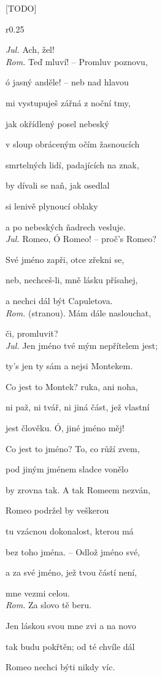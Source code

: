 \documentclass{extarticle} %
\begin{document}
\newpage


\changefontsize{8pt}

[TODO]

\noindent\begin{wrapfigure}{r}{0.25\textwidth}
\tiny

\setlength{\parindent}{3pt}
\noindent \textit{Jul.} Ach, žel! \\
\textit{Rom.} Teď mluví! -- Promluv poznovu, \par
ó jasný anděle! -- neb nad hlavou \par
mi vystupuješ zářná z noční tmy, \par
jak okřídlený posel nebeský \par
v sloup obráceným očím žasnoucích \par
smrtelných lidí, padajících na znak, \par
by dívali se naň, jak osedlal \par
si lenivě plynoucí oblaky \par
a po nebeských ňadrech vesluje. \\
\textit{Jul.} Romeo, Ó Romeo! -- proč's Romeo? \par
Své jméno zapři, otce zřekni se, \par
neb, nechceš-li, mně lásku přísahej, \par
a nechci dál být Capuletova. \\
\textit{Rom.} (stranou). Mám dále naslouchat, \par 
či, promluvit? \\
\textit{Jul.} Jen jméno tvé mým nepřítelem jest; \par
ty's jen ty sám a nejsi Montekem. \par
Co jest to Montek? ruka, ani noha, \par
ni paž, ni tvář, ni jiná část, jež vlastní \par
jest člověku. Ó, jiné jméno měj! \par
Co jest to jméno? To, co růží zvem, \par
pod jiným jménem sladce vonělo \par
by zrovna tak. A tak Romeem nezván, \par
Romeo podržel by veškerou \par
tu vzácnou dokonalost, kterou má \par
bez toho jména. -- Odlož jméno své, \par
a za své jméno, jež tvou částí není, \par
mne vezmi celou. \\
\textit{Rom.} Za slovo tě beru. \par
Jen láskou svou mne zvi a na novo \par
tak budu pokřtěn; od té chvíle dál \par
Romeo nechci býti nikdy víc. 
\end{wrapfigure}
\end{document}
